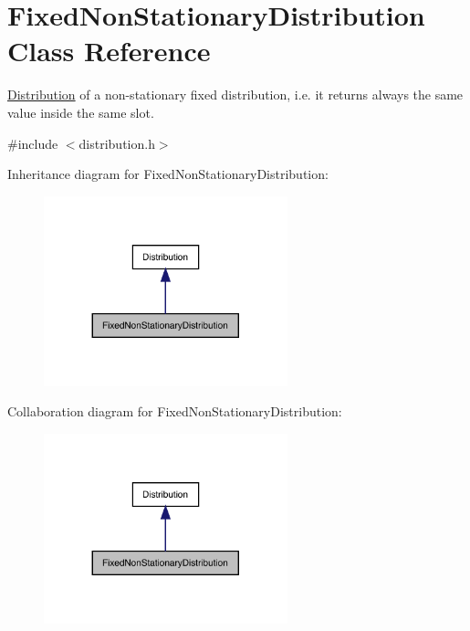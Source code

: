 \hypertarget{class_fixed_non_stationary_distribution}{}\section{Fixed\+Non\+Stationary\+Distribution Class Reference}
\label{class_fixed_non_stationary_distribution}


\mbox{\hyperlink{class_distribution}{Distribution}} of a non-\/stationary fixed distribution, i.\+e. it returns always the same value inside the same slot.  




{\ttfamily \#include $<$distribution.\+h$>$}



Inheritance diagram for Fixed\+Non\+Stationary\+Distribution\+:
\nopagebreak
\begin{figure}[H]
\begin{center}
\leavevmode
\includegraphics[width=200pt]{class_fixed_non_stationary_distribution__inherit__graph}
\end{center}
\end{figure}


Collaboration diagram for Fixed\+Non\+Stationary\+Distribution\+:
\nopagebreak
\begin{figure}[H]
\begin{center}
\leavevmode
\includegraphics[width=200pt]{class_fixed_non_stationary_distribution__coll__graph}
\end{center}
\end{figure}
